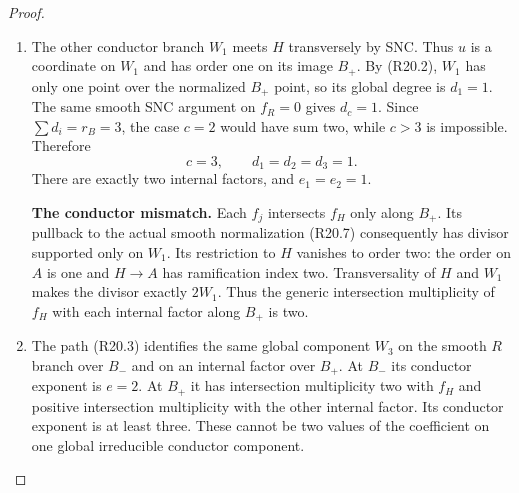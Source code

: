 \begin{proof}
\begin{enumerate}[label={$\langle1\rangle$\arabic*.},leftmargin=*]
\par\medskip\noindent\textbf{The exact normalization at the ramified endpoint.}
The cover $H\to A$ ramifies at $p$ by (R20.2).
Equation (R20.4) presents its spectral cover as
$w^2+g(0,z)=0$. After translating its double
root, smoothness from (R20.6) gives
$g_z(0,0)\ne0$. Hence
\[
 \begin{split}
        N_H&=\{w^2+g(u,z)=0\},\\
        (u,w,z)&\longmapsto(u,v=uw,z)
 \end{split}                                                   \tag{R20.7}
\]
is the actual normalization near that point.
It is smooth, finite, and birational onto the
branch (R20.4); off $u=0$ its inverse is
$w=v/u$. Coordinates $(u,w)$ solve
$z=\psi(u,w)$, with $z|_H$ of order two in
$w$. The minimal normalization resolution
has no exceptional curve over this smooth
point, and $H$ is $u=0$.

\item The other conductor branch $W_1$ meets $H$
transversely by SNC. Thus $u$ is a coordinate
on $W_1$ and has order one on its image
$B_+$. By (R20.2), $W_1$ has only one point
over the normalized $B_+$ point, so its
global degree is $d_1=1$. The same smooth
SNC argument on $f_R=0$ gives $d_c=1$.
Since $\sum d_i=r_B=3$, the case $c=2$
would have sum two, while $c>3$ is impossible.
Therefore
\[
                 c=3,\qquad d_1=d_2=d_3=1.              \tag{R20.8}
\]
There are exactly two internal factors, and
$e_1=e_2=1$.

\par\medskip\noindent\textbf{The conductor mismatch.}
Each $f_j$ intersects $f_H$ only along $B_+$.
Its pullback to the actual smooth normalization
(R20.7) consequently has divisor supported
only on $W_1$. Its restriction to $H$ vanishes
to order two: the order on $A$ is one and
$H\to A$ has ramification index two.
Transversality of $H$ and $W_1$ makes the
divisor exactly $2W_1$. Thus the generic
intersection multiplicity of $f_H$ with
each internal factor along $B_+$ is two.

\item The path (R20.3) identifies the same global
component $W_3$ on the smooth $R$ branch
over $B_-$ and on an internal factor over
$B_+$. At $B_-$ its conductor exponent is
$e=2$. At $B_+$ it has intersection
multiplicity two with $f_H$ and positive
intersection multiplicity with the other
internal factor. Its conductor exponent
is at least three. These cannot be two
values of the coefficient on one global
irreducible conductor component.


\end{enumerate}
\end{proof}
